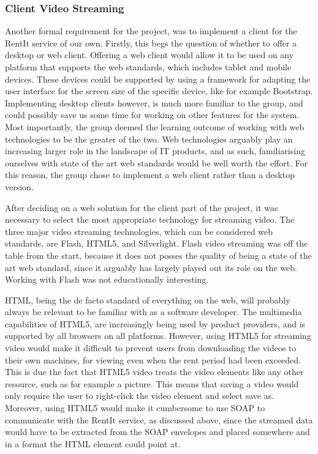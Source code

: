 \subsubsection{Client Video Streaming} \label{VideoStreaming}
Another formal requirement for the project, was to implement a client for the RentIt service of our own. Firstly, this begs the question of whether to offer a desktop or web client. Offering a web client would allow it to be used on any platform that supports the web standards, which includes tablet and mobile devices. These devices could be supported by using a framework for adapting the user interface for the screen size of the specific device, like for example Bootstrap. Implementing desktop clients however, is much more familiar to the group, and could possibly save us some time for working on other features for the system. Most importantly, the group deemed the learning outcome of working with web technologies to be the greater of the two. Web technologies arguably play an increasing larger role in the landscape of IT products, and as such, familiarising ourselves with state of the art web standards would be well worth the effort. For this reason, the group chose to implement a web client rather than a desktop version.

After deciding on a web solution for the client part of the project, it was necessary to select the most appropriate technology for streaming video. The three major video streaming technologies, which can be considered web standards, are Flash, HTML5, and Silverlight.
Flash video streaming was off the table from the start, because it does not posses the quality of being a state of the art web standard, since it arguably has largely played out its role on the web\cite{AFB}. Working with Flash was not educationally interesting.

HTML, being the de facto standard of everything on the web, will probably always be relevant to be familiar with as a software developer. The multimedia capabilities of HTML5, are increasingly being used by product providers, and is supported by all browsers on all platforms. However, using HTML5 for streaming video would make it difficult to prevent users from downloading the videos to their own machines, for viewing even when the rent period had been exceeded. This is due the fact that HTML5 video treats the video elements like any other resource, such as for example a picture. This means that saving a video would only require the user to right-click the video element and select save as. Moreover, using HTML5 would make it cumbersome to use SOAP to communicate with the RentIt service, as discussed above, since the streamed data would have to be extracted from the SOAP envelopes and placed somewhere and in a format the HTML element could point at.

